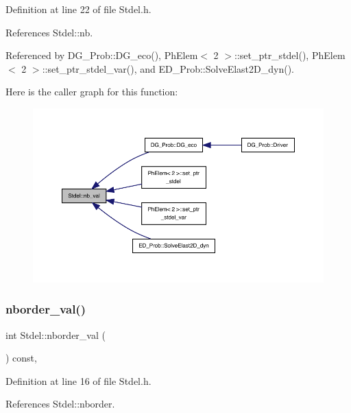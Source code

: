 Definition at line 22 of file Stdel.\+h.



References Stdel\+::nb.



Referenced by D\+G\+\_\+\+Prob\+::\+D\+G\+\_\+eco(), Ph\+Elem$<$ 2 $>$\+::set\+\_\+ptr\+\_\+stdel(), Ph\+Elem$<$ 2 $>$\+::set\+\_\+ptr\+\_\+stdel\+\_\+var(), and E\+D\+\_\+\+Prob\+::\+Solve\+Elast2\+D\+\_\+dyn().

Here is the caller graph for this function\+:
\nopagebreak
\begin{figure}[H]
\begin{center}
\leavevmode
\includegraphics[width=350pt]{classStdel_a4fb0a049dc27d8e67665a56d1b5a18ba_icgraph}
\end{center}
\end{figure}
\mbox{\label{classStdel_aac8e97661e46c48fafa91f13caa03a9f}} 
\subsubsection{\texorpdfstring{nborder\+\_\+val()}{nborder\_val()}}
{\footnotesize\ttfamily int Stdel\+::nborder\+\_\+val (\begin{DoxyParamCaption}{ }\end{DoxyParamCaption}) const\hspace{0.3cm}{\ttfamily [inline]}, {\ttfamily [inherited]}}



Definition at line 16 of file Stdel.\+h.



References Stdel\+::nborder.



